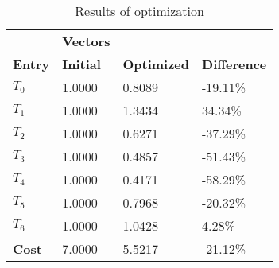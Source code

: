 \begin{table}[h!]
\centering
\begin{tabular}{llll}
\textbf{}      & \cellcolor[HTML]{EFEFEF}\textbf{Vectors} & \textbf{} & \textbf{}         \\
\rowcolor[HTML]{EFEFEF} 
\textbf{Entry} & \textbf{Initial} & \textbf{Optimized} & \textbf{Difference} \\
$T_0$ & 1.0000 & 0.8089 & -19.11\% \\ 
$T_1$ & 1.0000 & 1.3434 & 34.34\% \\ 
$T_2$ & 1.0000 & 0.6271 & -37.29\% \\ 
$T_3$ & 1.0000 & 0.4857 & -51.43\% \\ 
$T_4$ & 1.0000 & 0.4171 & -58.29\% \\ 
$T_5$ & 1.0000 & 0.7968 & -20.32\% \\ 
$T_6$ & 1.0000 & 1.0428 & 4.28\% \\ 
\rowcolor[HTML]{EFEFEF} 
\textbf{Cost}  & 7.0000 & 5.5217 & -21.12\% \\ 
\end{tabular}
\caption{Results of optimization}
\label{tab:OptimizationAnalysis}
\end{table}